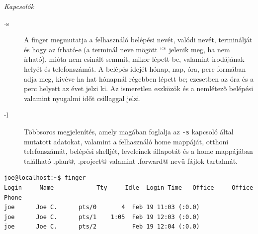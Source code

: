 \textit{Kapcsolók}
\begin{description}
\item[-s] A finger megmutatja a felhasználó belépési nevét, valódi nevét, terminálját és hogy az írható-e (a terminál neve mögött ``* jelenik meg, ha nem írható), mióta nem csinált semmit, mikor lépett be, valamint irodájának helyét és telefonszámát. A belépés idejét hónap, nap, óra, perc formában adja meg, kivéve ha hat hónapnál régebben lépett be; ezesetben az óra és a perc helyett az évet jelzi ki. Az ismeretlen eszközök és a nemlétező belépési valamint nyugalmi időt csillaggal jelzi.

\item[-l] Többsoros megjelenítés, amely magában foglalja az \verb.-s. kapcsoló által mutatott adatokat, valamint a felhasználó home mappáját, otthoni telefonszámát, belépési shelljét, leveleinek állapotát és a home mappájában található \verb@.plan@, \verb@.project@ valamint \verb@.forward@ nevű fájlok tartalmát.
\end{description}

\begin{lstlisting}
joe@localhost:~$ finger
Login     Name            Tty     Idle  Login Time   Office     Office Phone
joe      Joe C.  	 pts/0       4  Feb 19 11:03 (:0.0)
joe      Joe C.  	 pts/1    1:05  Feb 19 12:03 (:0.0)
joe      Joe C.  	 pts/2          Feb 19 12:04 (:0.0)
\end{lstlisting}



